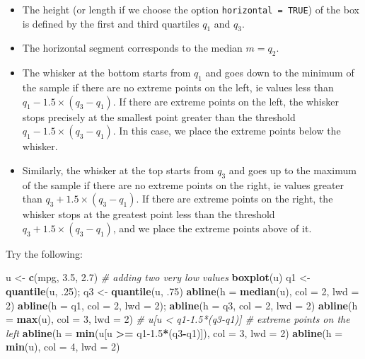\documentclass[]{book}
\newenvironment{Shaded}{\begin{snugshade}}{\end{snugshade}}
\newcommand{\CommentTok}[1]{\textcolor[rgb]{0.56,0.35,0.01}{\textit{#1}}}
\newcommand{\DataTypeTok}[1]{\textcolor[rgb]{0.13,0.29,0.53}{#1}}
\newcommand{\DecValTok}[1]{\textcolor[rgb]{0.00,0.00,0.81}{#1}}
\newcommand{\FloatTok}[1]{\textcolor[rgb]{0.00,0.00,0.81}{#1}}
\newcommand{\KeywordTok}[1]{\textcolor[rgb]{0.13,0.29,0.53}{\textbf{#1}}}
\newcommand{\NormalTok}[1]{#1}
\newcommand{\OperatorTok}[1]{\textcolor[rgb]{0.81,0.36,0.00}{\textbf{#1}}}
\newcommand{\StringTok}[1]{\textcolor[rgb]{0.31,0.60,0.02}{#1}}
\providecommand{\tightlist}{%
  \setlength{\itemsep}{0pt}\setlength{\parskip}{0pt}}
\begin{document}
\begin{itemize}
\tightlist
\item
  The height (or length if we choose the option \texttt{horizontal\ =\ TRUE}) of the box is defined by the first and third quartiles \(q_1\) and \(q_3\).
\item
  The horizontal segment corresponds to the median \(m = q_2\).
\item
  The whisker at the bottom starts from \(q_1\) and goes down to the minimum of the sample if there are no extreme points on the left, ie values less than \(q_1-1.5\times (q_3-q_1)\). If there are extreme points on the left, the whisker stops precisely at the smallest point greater than the threshold \(q_1-1.5\times (q_3-q_1)\). In this case, we place the extreme points below the whisker.
\item
  Similarly, the whisker at the top starts from \(q_3\) and goes up to the maximum of the sample if there are no extreme points on the right, ie values greater than \(q_3+1.5 \times(q_3-q_1)\). If there are extreme points on the right, the whisker stops at the greatest point less than the threshold \(q_3+1.5\times (q_3-q_1)\), and we place the extreme points above of it.
\end{itemize}

Try the following:

\begin{Shaded}
\begin{Highlighting}[]
\NormalTok{u <-}\StringTok{ }\KeywordTok{c}\NormalTok{(mpg, }\FloatTok{3.5}\NormalTok{, }\FloatTok{2.7}\NormalTok{) }\CommentTok{# adding two very low values}
\KeywordTok{boxplot}\NormalTok{(u)}
\NormalTok{q1 <-}\StringTok{ }\KeywordTok{quantile}\NormalTok{(u, }\FloatTok{.25}\NormalTok{); q3 <-}\StringTok{ }\KeywordTok{quantile}\NormalTok{(u, }\FloatTok{.75}\NormalTok{)}
\KeywordTok{abline}\NormalTok{(}\DataTypeTok{h =} \KeywordTok{median}\NormalTok{(u), }\DataTypeTok{col =} \DecValTok{2}\NormalTok{, }\DataTypeTok{lwd =} \DecValTok{2}\NormalTok{)}
\KeywordTok{abline}\NormalTok{(}\DataTypeTok{h =}\NormalTok{ q1, }\DataTypeTok{col =} \DecValTok{2}\NormalTok{, }\DataTypeTok{lwd =} \DecValTok{2}\NormalTok{); }\KeywordTok{abline}\NormalTok{(}\DataTypeTok{h =}\NormalTok{ q3, }\DataTypeTok{col =} \DecValTok{2}\NormalTok{, }\DataTypeTok{lwd =} \DecValTok{2}\NormalTok{)}
\KeywordTok{abline}\NormalTok{(}\DataTypeTok{h =} \KeywordTok{max}\NormalTok{(u), }\DataTypeTok{col =} \DecValTok{3}\NormalTok{, }\DataTypeTok{lwd =} \DecValTok{2}\NormalTok{)}
\CommentTok{# u[u < q1-1.5*(q3-q1)] # extreme points on the left}
\KeywordTok{abline}\NormalTok{(}\DataTypeTok{h =} \KeywordTok{min}\NormalTok{(u[u }\OperatorTok{>=}\StringTok{ }\NormalTok{q1}\FloatTok{-1.5}\OperatorTok{*}\NormalTok{(q3}\OperatorTok{-}\NormalTok{q1)]), }\DataTypeTok{col =} \DecValTok{3}\NormalTok{, }\DataTypeTok{lwd =} \DecValTok{2}\NormalTok{)}
\KeywordTok{abline}\NormalTok{(}\DataTypeTok{h =} \KeywordTok{min}\NormalTok{(u), }\DataTypeTok{col =} \DecValTok{4}\NormalTok{, }\DataTypeTok{lwd =} \DecValTok{2}\NormalTok{)}
\end{Highlighting}
\end{Shaded}
\end{document}
